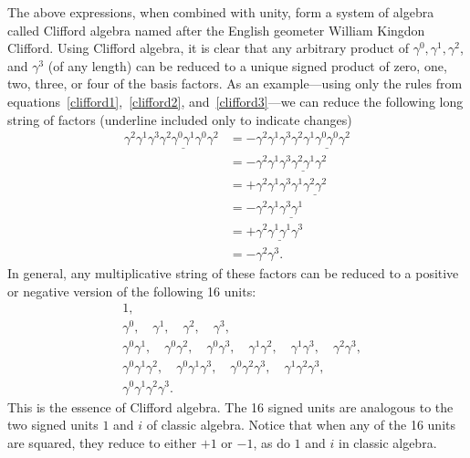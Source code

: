 \documentclass[titlepage,letterpaper,onecolumn,11pt,final]{report}
\newcommand{\gama}{\gamma^{0}}
\newcommand{\gamb}{\gamma^{1}}
\newcommand{\gamc}{\gamma^{2}}
\newcommand{\gamd}{\gamma^{3}}
\numberwithin{equation}{section}
\numberwithin{figure}{section}
\begin{document}
The above expressions, when combined with unity, form a system of algebra called Clifford algebra named after the English geometer William Kingdon Clifford. Using Clifford algebra, it is clear that any arbitrary product of $\gama, \gamb, \gamc$, and $\gamd$ (of any length) can be reduced to a unique signed product of zero, one, two, three, or four of the basis factors. As an example---using only the rules from equations~\ref{clifford1},~\ref{clifford2}, and~\ref{clifford3}---we can reduce the following long string of factors (underline included only to indicate changes)
\begin{equation}
	\begin{split}
	\gamc \gamb \gamd \gamc \underline{\gama \gamb} \gama \gamc &= - \gamc \gamb \gamd \gamc \gamb \underline{\gama \gama} \gamc \\
	&= - \gamc \gamb \gamd \underline{\gamc \gamb} \gamc \\
	&= + \gamc \gamb \gamd \gamb \underline{\gamc \gamc} \\
	&= - \gamc \gamb \underline{\gamd \gamb} \\
	&= + \gamc \underline{\gamb \gamb} \gamd \\
	&= - \gamc \gamd .
	\end{split}
\end{equation}
%
In general, any multiplicative string of these factors can be reduced to a positive or negative version of the following 16 units:
\begin{equation}
	\begin{split}
	\label{eq_gamma_factors}
	& 1, \\
	& \gama, 	\quad 	\gamb,  \quad 	\gamc, 	\quad 	\gamd, \\
	& \gama \gamb, 	\quad		\gama \gamc, 	\quad 	\gama \gamd,  \quad 	\gamb \gamc, 	\quad 	\gamb \gamd,		\quad 	\gamc \gamd, \\
	& \gama \gamb \gamc, 	\quad		\gama \gamb \gamd,	 \quad		\gama \gamc \gamd,		\quad 	\gamb \gamc \gamd, \\
	& \gama \gamb \gamc \gamd .
	\end{split}
\end{equation}
This is the essence of Clifford algebra. The 16 signed units are analogous to the two signed units $1$ and $i$ of classic algebra. Notice that when any of the 16 units are squared, they reduce to either $+1$ or $-1$, as do $1$ and $i$ in classic algebra.
\end{document}
